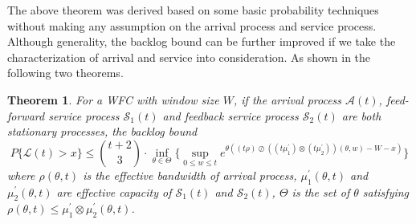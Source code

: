 \documentclass[12pt]{article}
\newtheorem{theorem}{Theorem}
\begin{document}
The above theorem was derived based on some basic probability techniques without making any assumption on the arrival process and service process. Although generality, the backlog bound can be further improved if we take the characterization of arrival and service into consideration. As shown in the following two theorems.
\begin{theorem}\label{theorem2}
For a WFC with window size $W$, if the arrival process $\mathcal{A}(t)$, feed-forward service process $\mathcal{S}_1(t)$ and feedback service process $\mathcal{S}_2(t)$ are both stationary processes, the backlog bound
$$P\{\mathcal{L}(t)>x\}\leq {t+2\choose 3}\cdot \inf_{\theta\in\Theta}\{\sup_{0\leq w\leq t}e^{\theta((t\rho)\oslash((t\mu_1^\prime)\otimes(t\mu_2^\prime))(\theta,w)-W-x)}\}$$
where $\rho(\theta,t)$ is the effective bandwidth of arrival process, $\mu_1^\prime(\theta,t)$ and $\mu_2^\prime(\theta,t)$ are effective capacity of $\mathcal{S}_1(t)$ and $\mathcal{S}_2(t)$, $\Theta$ is the set of $\theta$ satisfying $\rho(\theta,t)\leq \mu_1^\prime\otimes\mu_2^\prime(\theta,t)$.
\end{theorem}
\end{document}
